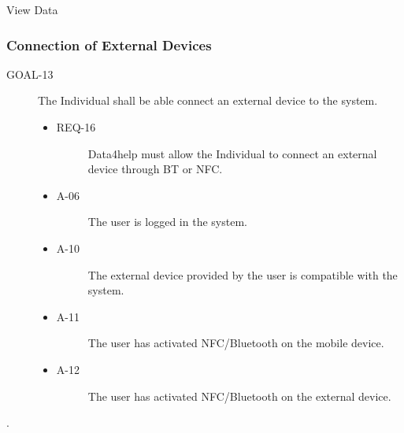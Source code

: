 \documentclass[a4paper]{article}
\newcommand{\requirement}{\ding{229}}%
\begin{document}
        
        \begin{usecase}{View Data}
        \end{usecase}
        
        
        
        \subsubsection{Connection of External Devices}

 \begin{description}
        	\item[GOAL-13] The Individual shall be able connect an external device to the system.
            	\begin{itemize}
            	    \item[\requirement]
                	\begin{description}
                	\item[REQ-16] Data4help must allow the Individual to connect an external device through BT or NFC.
                	\end{description}
                	\item
                	\begin{description}
                	\item[A-06] The user is logged in the system.
                	\end{description}
                	\item
                	\begin{description}
                	\item[A-10] The external device provided by the user is compatible with the system.
                	\end{description}
                	\item
                	\begin{description}
                	\item[A-11] The user has activated NFC/Bluetooth on the mobile device.
                	\end{description}
                	\item
                	\begin{description}
                	\item[A-12] The user has activated NFC/Bluetooth on the external device.
                	\end{description}
                	\end{itemize}
        \end{description}.
        
\end{document}
